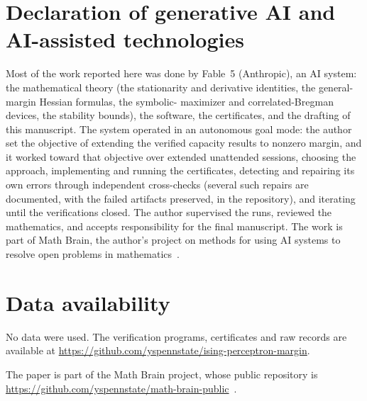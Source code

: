 \documentclass[11pt]{article}
\theoremstyle{remark}
\begin{document}
\section*{Declaration of generative AI and AI-assisted technologies}
Most of the work reported here was done by Fable~5 (Anthropic), an AI
system: the mathematical theory (the stationarity and derivative
identities, the general-margin Hessian formulas, the symbolic-
maximizer and correlated-Bregman devices, the stability bounds), the
software, the certificates, and the drafting of this manuscript.  The
system operated in an autonomous goal mode: the author set the
objective of extending the verified capacity results to nonzero
margin, and it worked toward that objective over extended unattended
sessions, choosing the approach, implementing and running the
certificates, detecting and repairing its own errors through
independent cross-checks (several such repairs are documented, with
the failed artifacts preserved, in the repository), and iterating
until the verifications closed.  The author supervised the runs,
reviewed the mathematics, and accepts responsibility for the final
manuscript.  The work is part of Math Brain, the author's project on
methods for using AI systems to resolve open problems in
mathematics~\cite{MathBrainPaper}.

\section*{Data availability}
No data were used. The verification programs, certificates and raw
records are available at
\url{https://github.com/yspennstate/ising-perceptron-margin}.

The paper is part of the Math Brain project, whose public repository is \url{https://github.com/yspennstate/math-brain-public}~\cite{MathBrainRepo}.
\end{document}
